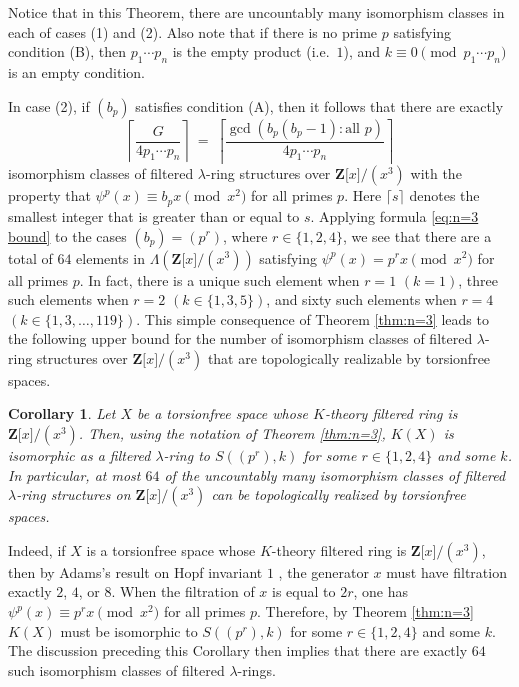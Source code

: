 \documentclass[reqno,11pt]{amsart}
\numberwithin{equation}{subsection}  %
\newtheorem{cor}[subsection]{Corollary}
\newcommand{\bZ}{\mathbf{Z}}
\begin{document}
Notice that in this Theorem, there are uncountably many isomorphism classes in each of cases (1) and (2).  Also note that if there is no prime $p$ satisfying condition (B), then $p_1 \cdots p_n$ is the empty product (i.e.\ $1$), and $k \equiv 0 \pmod{p_1 \cdots p_n}$ is an empty condition.


In case (2), if $(b_p)$ satisfies condition (A), then it follows that there are exactly 
   \begin{equation}
   \label{eq:n=3 bound}
   \left\lceil \frac{G}{4p_1 \cdots p_n} \right\rceil 
   ~=~ \left\lceil \frac{\gcd(b_p(b_p - 1)\colon \text{all } p)}{4p_1 \cdots p_n} \right\rceil 
   \end{equation}
isomorphism classes of filtered $\lambda$-ring structures over $\bZ \lbrack x \rbrack/(x^3)$ with the property that $\psi^p(x) \equiv b_p x \pmod{x^2}$ for all primes $p$.  Here $\lceil s \rceil$ denotes the smallest integer that is greater than or equal to $s$.  Applying formula \eqref{eq:n=3 bound} to the cases $(b_p) = (p^r)$, where $r \in \lbrace 1, 2, 4 \rbrace$, we see that there are a total of $64$ elements in $\Lambda(\bZ \lbrack x \rbrack/(x^3))$ satisfying $\psi^p(x) = p^r x \pmod{x^2}$ for all primes $p$.  In fact, there is a unique such element when $r = 1$ $(k = 1)$, three such elements when $r = 2$ $(k \in \lbrace 1, 3, 5 \rbrace)$, and sixty such elements when $r = 4$ $(k \in \lbrace 1, 3, \ldots , 119\rbrace)$.  This simple consequence of Theorem \ref{thm:n=3} leads to the following upper bound for the number of isomorphism classes of filtered $\lambda$-ring structures over $\bZ \lbrack x \rbrack/(x^3)$ that are topologically realizable by torsionfree spaces.

\pagebreak
\begin{cor}
\label{cor:n=3}
Let $X$ be a torsionfree space whose $K$-theory filtered ring is $\bZ\lbrack x \rbrack/(x^3)$.  Then, using the notation of Theorem \ref{thm:n=3}, $K(X)$ is isomorphic as a filtered $\lambda$-ring to $S((p^r), k)$ for some $r \in \lbrace 1, 2, 4 \rbrace$ and some $k$.  In particular, at most $64$ of the uncountably many isomorphism classes of filtered $\lambda$-ring structures on $\bZ \lbrack x \rbrack/(x^3)$ can be topologically realized by torsionfree spaces.
\end{cor}


Indeed, if $X$ is a torsionfree space whose $K$-theory filtered ring is $\bZ \lbrack x \rbrack/(x^3)$, then by Adams's result on Hopf invariant $1$ \cite{adams1}, the generator $x$ must have filtration exactly $2$, $4$, or $8$.  When the filtration of $x$ is equal to $2r$, one has $\psi^p(x) \equiv p^r x \pmod{x^2}$ for all primes $p$.  Therefore, by Theorem \ref{thm:n=3} $K(X)$ must be isomorphic to $S((p^r), k)$ for some $r \in \lbrace 1, 2, 4 \rbrace$ and some $k$.  The discussion preceding this Corollary then implies that there are exactly $64$ such isomorphism classes of filtered $\lambda$-rings.
\end{document}
